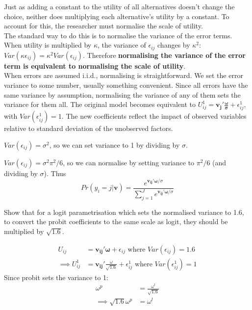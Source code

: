 \documentclass[DIV=14,titlepage=false]{scrreprt}
\begin{document}
Just as adding a constant to the utility of all alternatives doesn't change the choice, neither does multiplying each alternative's utility by a constant. To account for this, the researcher must normalise the scale of utility.\\
The standard way to do this is to normalise the variance of the error terms. When utility is multiplied by $\kappa$, the variance of $\epsilon_{ij}$ changes by $\kappa^2$: $Var(\kappa \epsilon_{ij}) = \kappa^2 Var(\epsilon_{ij})$. Therefore \textbf{normalising the variance of the error term is equivalent to normalising the scale of utility}.\\
When errors are assumed i.i.d., normalising is straightforward. We set the error variance to some number, usually something convenient. Since all errors have the same variance by assumption, normalising the variance of any of them sets the variance for them all. The original model becomes equivalent to $U_{ij}^1 = \mathbf{v_j'\frac{\omega}{\sigma}} + \epsilon_{ij}^1$, with $Var(\epsilon_{ij}^1) = 1$. The new coefficients reflect the impact of observed variables relative to standard deviation of the unobserved factors.
\begin{example}[Probit]
    $Var(\epsilon_{ij}) = \sigma^2$, so we can set variance to 1 by dividing by $\sigma$. 
\end{example}
\begin{example}[Logit]
    $Var(\epsilon_{ij}) = \sigma^2 \pi^2/6$, so we can normalise by setting variance to $\pi^2/6$ (and dividing by $\sigma$).
    Thus 
    \[
        Pr(y_i = j|\mathbf{v}) = \frac{e^{\mathbf{v_{ij}'\omega}/\sigma}}{\sum_{j=1}^J e^{\mathbf{v_{ij}'\omega}/\sigma}}
    \]
\end{example}
\begin{question}
    Show that for a logit parametrisation which sets the normalised variance to 1.6, to convert the probit coefficients to the same scale as logit, they should be multiplied by $\sqrt{1.6}$.
\end{question}
\begin{solution}
\begin{align*}
    U_{ij} &= \mathbf{v_{ij}'\omega} + \epsilon_{ij} \text{ where } Var(\epsilon_{ij}) = 1.6 \\
    \implies U_{ij}^1 &= \mathbf{v_{ij}'}\frac{\omega}{\sqrt{1.6}} + \epsilon_{ij}^1 \text{ where } Var(\epsilon_{ij}^1) = 1
\end{align*}
Since probit sets the variance to 1:
\begin{align*}
    \omega^p &= \frac{\omega^l}{\sqrt{1.6}} \\
    \implies \sqrt{1.6}\omega^p &= \omega^l
\end{align*}
\end{solution}
\end{document}
